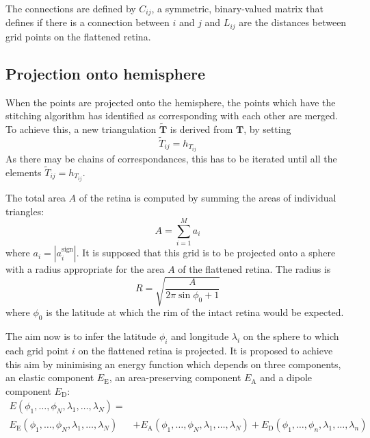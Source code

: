 \documentclass{article}
\begin{document}


The connections are defined by $C_{ij}$, a symmetric, binary-valued
matrix that defines if there is a connection between $i$ and $j$ and
$L_{ij}$ are the distances between grid points on the flattened
retina.

\subsection{Projection onto hemisphere}
\label{fold-sphere:sec:proj-onto-hemisph}

When the points are projected onto the hemisphere, the points which
have the stitching algorithm has identified as corresponding with each
other are merged. To achieve this, a new triangulation
$\tilde{\mathbf{T}}$ is derived from $\mathbf{T}$, by setting
\begin{displaymath}
  \tilde{T}_{ij} = h_{T_{ij}}
\end{displaymath}
As there may be chains of correspondances, this has to be iterated
until all the elements $\tilde{T}_{ij} = h_{T_{ij}}$.


The total area $A$ of the retina is computed by summing the areas of
individual triangles:
\begin{displaymath}
  A = \sum_{i=1}^M a_i
\end{displaymath}
where $a_i = | a_i^\mathrm{sign}|$.  It is supposed that this grid is
to be projected onto a sphere with a radius appropriate for the area
$A$ of the flattened retina. The radius is
\begin{equation}
  \label{fold-sphere:eq:1}
  R = \sqrt{\frac{A}{2\pi\sin\phi_0+1}}
\end{equation}
where $\phi_0$ is the latitude at which the rim of the intact retina
would be expected.

The aim now is to infer the latitude $\phi_i$ and longitude
$\lambda_i$ on the sphere to which each grid point $i$ on the
flattened retina is projected.  It is proposed to achieve this aim by
minimising an energy function which depends on three components, an
elastic component $E_\mathrm{E}$, an area-preserving component
$E_\mathrm{A}$ and a dipole component $E_\mathrm{D}:$
\begin{equation}
  \begin{split}
  E(\phi_1,\dots,\phi_N,\lambda_1,\dots,\lambda_N) = & \\
  E_\mathrm{E}(\phi_1,\dots,\phi_N,\lambda_1,\dots,\lambda_N) 
  & + E_\mathrm{A}(\phi_1,\dots,\phi_N,\lambda_1,\dots,\lambda_N) 
  + E_\mathrm{D}(\phi_1,\dots,\phi_n,\lambda_1,\dots,\lambda_n)
  \end{split}
\end{equation}
\end{document}
